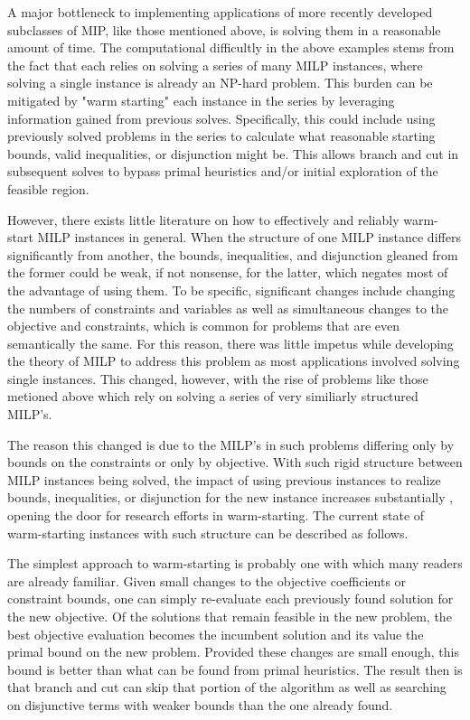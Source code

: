\documentclass[10pt]{article}
\begin{document}
	A major bottleneck to implementing applications of more recently developed subclasses of MIP, like those mentioned above, is solving them in a reasonable amount of time. The computational difficultly in the above examples stems from the fact that each relies on solving a series of many MILP instances, where solving a single instance is already an NP-hard problem. This burden can be mitigated by "warm starting" each instance in the series by leveraging information gained from previous solves. Specifically, this could include using previously solved problems in the series to calculate what reasonable starting bounds, valid inequalities, or disjunction might be. This allows branch and cut in subsequent solves to bypass primal heuristics and/or initial exploration of the feasible region.
	
	However, there exists little literature on how to effectively and reliably warm-start MILP instances in general. When the structure of one MILP instance differs significantly from another, the bounds, inequalities, and disjunction gleaned from the former could be weak, if not nonsense, for the latter, which negates most of the advantage of using them. To be specific, significant changes include changing the numbers of constraints and variables as well as simultaneous changes to the objective and constraints, which is common for problems that are even semantically the same. For this reason, there was little impetus while developing the theory of MILP to address this problem as most applications involved solving single instances. This changed, however, with the rise of problems like those metioned above which rely on solving a series of very similiarly structured MILP's.
	
	The reason this changed is due to the MILP's in such problems differing only by bounds on the constraints or only by objective. With such rigid structure between MILP instances being solved, the impact of using previous instances to realize bounds, inequalities, or disjunction for the new instance increases substantially \cite{ws}, opening the door for research efforts in warm-starting. The current state of warm-starting instances with such structure can be described as follows.
	
	The simplest approach to warm-starting is probably one with which many readers are already familiar. Given small changes to the objective coefficients or constraint bounds, one can simply re-evaluate each previously found solution for the new objective. Of the solutions that remain feasible in the new problem, the best objective evaluation becomes the incumbent solution and its value the primal bound on the new problem. Provided these changes are small enough, this bound is better than what can be found from primal heuristics. The result then is that branch and cut can skip that portion of the algorithm as well as searching on disjunctive terms with weaker bounds than the one already found.
	
\end{document}
